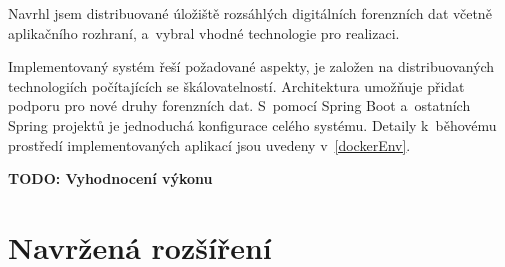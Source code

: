 Navrhl jsem distribuované úložiště rozsáhlých digitálních forenzních dat včetně aplikačního rozhraní, a~vybral vhodné technologie pro realizaci.

Implementovaný systém řeší požadované aspekty, je založen na distribuovaných technologiích počítajících se škálovatelností. Architektura umožňuje přidat podporu pro nové druhy forenzních dat. S~pomocí Spring Boot a~ostatních Spring projektů je jednoduchá konfigurace celého systému. Detaily k~běhovému prostředí implementovaných aplikací jsou uvedeny v~\ref{dockerEnv}.

\vspace{0.5cm}
\noindent \textbf{TODO: Vyhodnocení výkonu}

\section{Navržená rozšíření}

